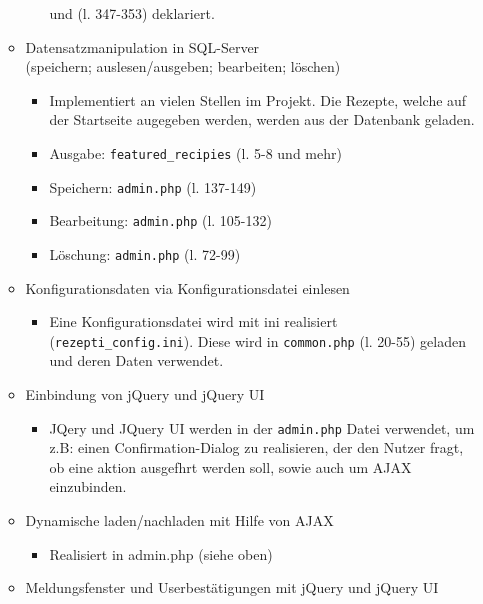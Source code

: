 \documentclass{article}
\begin{document}
\begin{itemize}
\begin{itemize}
\begin{itemize}
                    und (l. 347-353) deklariert.
            \end{itemize}
            \pagebreak
        \item Datensatzmanipulation in SQL-Server\\
            (speichern; auslesen/ausgeben; bearbeiten; löschen)
            \begin{itemize}
            \item Implementiert an vielen Stellen im Projekt. Die Rezepte, welche auf der 
                Startseite augegeben werden, werden aus der Datenbank geladen.
            \item Ausgabe: \verb|featured_recipies| (l. 5-8 und mehr)
            \item Speichern: \verb|admin.php| (l. 137-149)
            \item Bearbeitung: \verb|admin.php| (l. 105-132)
            \item Löschung: \verb|admin.php| (l. 72-99)
            \end{itemize}
        \item Konfigurationsdaten via Konfigurationsdatei einlesen
            \begin{itemize}
                \item Eine Konfigurationsdatei wird mit ini realisiert (\verb|rezepti_config.ini|).
                    Diese wird in \verb|common.php| (l. 20-55) geladen und deren Daten verwendet.
            \end{itemize}
        \item Einbindung von jQuery und jQuery UI\
            \begin{itemize}
                \item JQery und JQuery UI werden in der \verb|admin.php| Datei verwendet, 
                    um z.B: einen Confirmation-Dialog zu realisieren, der den Nutzer fragt, 
                    ob eine aktion ausgefhrt werden soll, sowie auch um AJAX einzubinden.
            \end{itemize}
        \item Dynamische laden/nachladen mit Hilfe von AJAX
            \begin{itemize}
                \item Realisiert in admin.php (siehe oben)
            \end{itemize}
        \item Meldungsfenster und Userbestätigungen mit jQuery und jQuery UI
            \begin{itemize}

\end{itemize}
\end{itemize}
\end{itemize}
\end{document}
